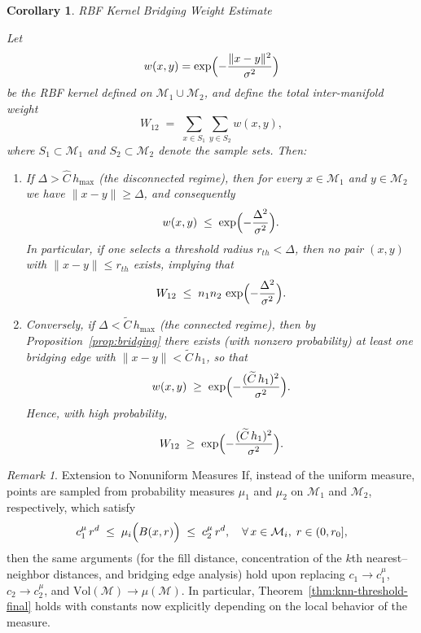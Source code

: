 \documentclass{article}
\theoremstyle{plain}
\newtheorem{corollary}[theorem]{Corollary}
\theoremstyle{definition}
\theoremstyle{remark}
\newtheorem{remark}[theorem]{Remark}
\begin{document}
\begin{corollary}{RBF Kernel Bridging Weight Estimate}  

Let 
\[
w(x,y)=\exp\Bigl(-\frac{\|x-y\|^2}{\sigma^2}\Bigr)
\]
be the RBF kernel defined on $\mathcal{M}_1\cup \mathcal{M}_2$, and define the total inter-manifold weight
\[
W_{12} \;=\; \sum_{x\in S_1}\sum_{y\in S_2} w(x,y),
\]
where $S_1\subset\mathcal{M}_1$ and $S_2\subset\mathcal{M}_2$ denote the sample sets. Then:
\begin{enumerate}
    \item If $\Delta > \widehat{C}\,h_{\max}$ (the disconnected regime), then for every $x\in\mathcal{M}_1$ and $y\in\mathcal{M}_2$ we have $\|x-y\|\ge \Delta$, and consequently
    \[
    w(x,y) \;\le\; \exp\Bigl(-\frac{\Delta^2}{\sigma^2}\Bigr).
    \]
    In particular, if one selects a threshold radius $r_{th}<\Delta$, then no pair $(x,y)$ with $\|x-y\|\le r_{th}$ exists, implying that
    \[
    W_{12} \;\le\; n_1n_2\,\exp\Bigl(-\frac{\Delta^2}{\sigma^2}\Bigr).
    \]
    \item Conversely, if $\Delta < \widetilde{C}\,h_{\max}$ (the connected regime), then by Proposition~\ref{prop:bridging} there exists (with nonzero probability) at least one bridging edge with $\|x-y\| < \widetilde{C}\,h_1$, so that
    \[
    w(x,y) \;\ge\; \exp\Bigl(-\frac{(\widetilde{C}\,h_1)^2}{\sigma^2}\Bigr).
    \]
    Hence, with high probability,
    \[
    W_{12} \;\ge\; \exp\Bigl(-\frac{(\widetilde{C}\,h_1)^2}{\sigma^2}\Bigr).
    \]
\end{enumerate}
\end{corollary}

\begin{remark}{Extension to Nonuniform Measures}  
If, instead of the uniform measure, points are sampled from probability measures $\mu_1$ and $\mu_2$ on $\mathcal{M}_1$ and $\mathcal{M}_2$, respectively, which satisfy
\[
c_1^\mu\,r^d \;\le\; \mu_i\Bigl(B(x,r)\Bigr) \;\le\; c_2^\mu\,r^d,\quad \forall\,x\in\mathcal{M}_i,\; r\in (0,r_0],
\]
then the same arguments (for the fill distance, concentration of the $k$th nearest--neighbor distances, and bridging edge analysis) hold upon replacing $c_1\to c_1^\mu$, $c_2\to c_2^\mu$, and $\mathrm{Vol}(\mathcal{M})\to \mu(\mathcal{M})$. In particular, Theorem~\ref{thm:knn-threshold-final} holds with constants now explicitly depending on the local behavior of the measure.
\end{remark}



\end{document}
